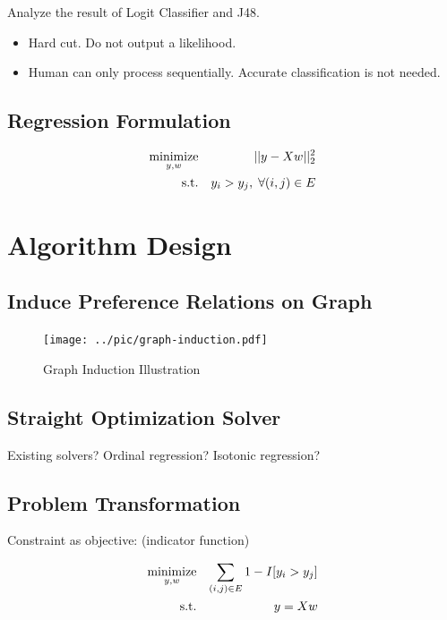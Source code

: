 \documentclass{sig-alternate}
\begin{document}
Analyze the result of Logit Classifier and J48. 

\begin{itemize}
	\item 
	Hard cut. Do not output a likelihood.
	\item 
	Human can only process sequentially. 
	Accurate classification is not needed.
\end{itemize}

\subsection{Regression Formulation}
\label{sec:Regression Formulation}

\begin{eqnarray}
	\operatorname*{minimize}_{y,w} && ||y - Xw||_2^2 \\
	\text{s.t.} && y_i > y_j, \; \forall (i,j) \in E
\end{eqnarray}

\section{Algorithm Design}
\label{sec:Algorithm Design}

\subsection{Induce Preference Relations on Graph}
\label{sec:Induce Preference Relations on Graph}

\begin{figure}[t!]
	\centering
	\texttt{[image: ../pic/graph-induction.pdf]}
	\caption{Graph Induction Illustration}
\end{figure}

\subsection{Straight Optimization Solver}
\label{sec:Straight Optimization Solver}

Existing solvers?
Ordinal regression?
Isotonic regression?

\subsection{Problem Transformation}
\label{sec:Problem Transformation}

Constraint as objective: (indicator function)

\begin{eqnarray}
	\operatorname*{minimize}_{y,w} && \sum_{(i,j) \in E} 1 - I[y_i > y_j] \\
	\text{s.t.} && y = Xw
\end{eqnarray}
\end{document}
